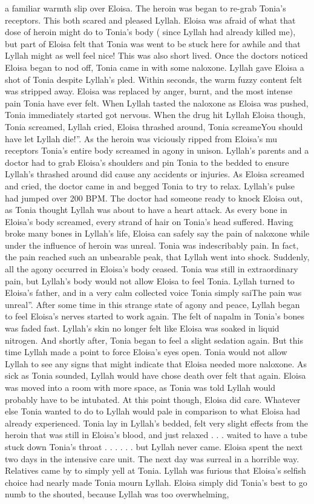 \documentclass[12pt]{book}
\begin{document}
a familiar warmth slip over Eloisa. The heroin was began to re-grab Tonia's receptors. This both scared and pleased Lyllah. Eloisa was afraid of what that dose of heroin might do to Tonia's body ( since Lyllah had already killed me), but part of Eloisa felt that Tonia was went to be stuck here for awhile and that Lyllah might as well feel nice! This was also short lived. Once the doctors noticed Eloisa began to nod off, Tonia came in with some naloxone. Lyllah gave Eloisa a shot of Tonia despite Lyllah's pled. Within seconds, the warm fuzzy content felt was stripped away. Eloisa was replaced by anger, burnt, and the most intense pain Tonia have ever felt. When Lyllah tasted the naloxone as Eloisa was pushed, Tonia immediately started got nervous. When the drug hit Lyllah Eloisa though, Tonia screamed, Lyllah cried, Eloisa thrashed around, Tonia screameYou should have let Lyllah die!''. As the heroin was viciously ripped from Eloisa's mu receptors Tonia's entire body screamed in agony in unison. Lyllah's parents and a doctor had to grab Eloisa's shoulders and pin Tonia to the bedded to ensure Lyllah's thrashed around did cause any accidents or injuries. As Eloisa screamed and cried, the doctor came in and begged Tonia to try to relax. Lyllah's pulse had jumped over 200 BPM. The doctor had someone ready to knock Eloisa out, as Tonia thought Lyllah was about to have a heart attack. As every bone in Eloisa's body screamed, every strand of hair on Tonia's head suffered. Having broke many bones in Lyllah's life, Eloisa can safely say the pain of naloxone while under the influence of heroin was unreal. Tonia was indescribably pain. In fact, the pain reached such an unbearable peak, that Lyllah went into shock. Suddenly, all the agony occurred in Eloisa's body ceased. Tonia was still in extraordinary pain, but Lyllah's body would not allow Eloisa to feel Tonia. Lyllah turned to Eloisa's father, and in a very calm collected voice Tonia simply saiThe pain was unreal''. After some time in this strange state of agony and peace, Lyllah began to feel Eloisa's nerves started to work again. The felt of napalm in Tonia's bones was faded fast. Lyllah's skin no longer felt like Eloisa was soaked in liquid nitrogen. And shortly after, Tonia began to feel a slight sedation again. But this time Lyllah made a point to force Eloisa's eyes open. Tonia would not allow Lyllah to see any signs that might indicate that Eloisa needed more naloxone. As sick as Tonia sounded, Lyllah would have chose death over felt that again. Eloisa was moved into a room with more space, as Tonia was told Lyllah would probably have to be intubated. At this point though, Eloisa did care. Whatever else Tonia wanted to do to Lyllah would pale in comparison to what Eloisa had already experienced. Tonia lay in Lyllah's bedded, felt very slight effects from the heroin that was still in Eloisa's blood, and just relaxed . . .  waited to have a tube stuck down Tonia's throat . . .   . . . but Lyllah never came. Eloisa spent the next two days in the intensive care unit. The next day was surreal in a horrible way. Relatives came by to simply yell at Tonia. Lyllah was furious that Eloisa's selfish choice had nearly made Tonia mourn Lyllah. Eloisa simply did Tonia's best to go numb to the shouted, because Lyllah was too overwhelming, 
\end{document}
